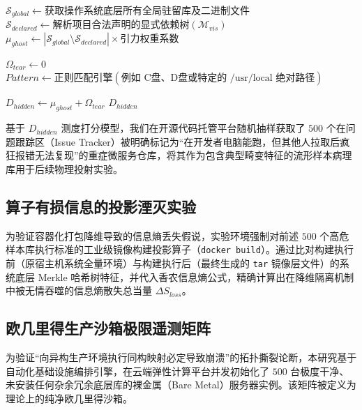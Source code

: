 \documentclass[journal]{IEEEtran}
\begin{document}
\begin{algorithm}[htpb]
\caption{环境暗物质高维特征量化探针}
\label{alg:dms_probe}
\SetAlgoLined
{}

$\mathcal{S}_{global} \leftarrow \text{获取操作系统底层所有全局驻留库及二进制文件}$\;
$\mathcal{S}_{declared} \leftarrow \text{解析项目合法声明的显式依赖树}(\mathcal{M}_{vis})$\;
$\mu_{ghost} \leftarrow |\mathcal{S}_{global} \setminus \mathcal{S}_{declared}| \times \text{引力权重系数}$\;

\BlankLine
{}
$\Omega_{tear} \leftarrow 0$\;
$Pattern \leftarrow \text{正则匹配引擎}(\text{例如 C盘、D盘或特定的 /usr/local 绝对路径})$\;

\BlankLine
$D_{hidden} \leftarrow \mu_{ghost} + \Omega_{tear}$\;
\Return $D_{hidden}$\;
\end{algorithm}

基于 $D_{hidden}$ 测度打分模型，我们在开源代码托管平台随机抽样获取了 $500$ 个在问题跟踪区（Issue Tracker）被明确标记为“在开发者电脑能跑，但其他人拉取后疯狂报错无法复现”的重症微服务仓库，将其作为包含典型畸变特征的流形样本病理库用于后续物理投射实验。

\subsection{算子有损信息的投影湮灭实验}
为验证容器化打包降维导致的信息熵丢失假说，实验环境强制对前述 $500$ 个高危样本库执行标准的工业级镜像构建投影算子（\texttt{docker build}）。通过比对构建执行前（原宿主机系统全量环境）与构建执行后（最终生成的 \texttt{tar} 镜像层文件）的系统底层 Merkle 哈希树特征，并代入香农信息熵公式，精确计算出在降维隔离机制中被无情吞噬的信息熵散失总当量 $\Delta S_{loss}$。

\subsection{欧几里得生产沙箱极限遥测矩阵}
为验证“向异构生产环境执行同构映射必定导致崩溃”的拓扑撕裂论断，本研究基于自动化基础设施编排引擎，在云端弹性计算平台并发初始化了 $500$ 台极度干净、未安装任何杂余冗余底层库的裸金属（Bare Metal）服务器实例。该矩阵被定义为理论上的纯净欧几里得沙箱。
\end{document}
